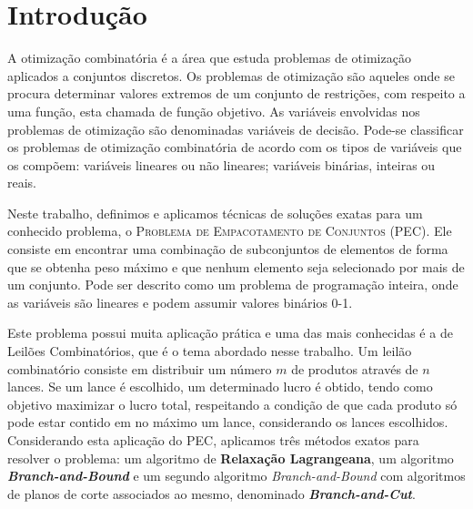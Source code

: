 \documentclass{article}
\begin{document}
	
	\section{Introdução}
	A otimização combinatória é a área que estuda problemas de otimização aplicados a conjuntos discretos. Os problemas de otimização são aqueles onde se procura determinar valores extremos de um conjunto de restrições, com respeito a uma função, esta chamada de função objetivo. As variáveis envolvidas nos problemas de otimização são denominadas variáveis de decisão. Pode-se classificar os problemas de otimização combinatória de acordo com os tipos de variáveis que os compõem: variáveis lineares ou não lineares; variáveis binárias, inteiras ou reais.
	
	Neste trabalho, definimos e aplicamos técnicas de soluções exatas para um conhecido problema, o \textsc{Problema de Empacotamento de Conjuntos (PEC)}.
	Ele consiste em encontrar uma combinação de subconjuntos de elementos de forma que se obtenha peso máximo e que nenhum elemento seja selecionado por mais de um conjunto. Pode ser descrito como um problema de programação inteira, onde as variáveis são lineares e podem assumir valores binários 0-1.
	
	Este problema possui muita aplicação prática e uma das mais conhecidas é a de Leilões Combinatórios, que é o tema abordado nesse trabalho. Um leilão combinatório consiste em distribuir um número $m$ de produtos através de $n$ lances. Se um lance é escolhido, um determinado lucro é obtido, tendo como objetivo maximizar o lucro total, respeitando a condição de que cada produto só pode estar contido em no máximo um lance, considerando os lances escolhidos. Considerando esta aplicação do PEC, aplicamos três métodos exatos para resolver o problema: um algoritmo de \textbf{Relaxação Lagrangeana}, um algoritmo \emph{\textbf{Branch-and-Bound}} e um segundo algoritmo \emph{{Branch-and-Bound}} com algoritmos de planos de corte associados ao mesmo, denominado \emph{\textbf{Branch-and-Cut}}.
	
\end{document}
